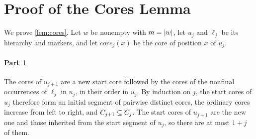 \section{Proof of the Cores Lemma}
\label{app:cores}

We prove \cref{lem:cores}. Let $w$ be nonempty with $m = \lvert w\rvert$, let $u_j$ and $\ell_j$ be its
hierarchy and markers, and let $\mathit{core}_j(x)$ be the core of position $x$ of $u_j$.

\paragraph{Part 1}
The cores of $u_{j+1}$ are a new start core followed by the cores of the nonfinal occurrences
of $\ell_j$ in $u_j$, in their order in $u_j$. By induction on $j$, the start cores of $u_j$
therefore form an initial segment of pairwise distinct cores, the ordinary cores increase from
left to right, and $C_{j+1} \subseteq C_j$. The start cores of $u_{j+1}$ are the new
one and those inherited from the start segment of $u_j$, so there are at most $1 + j$ of
them.


